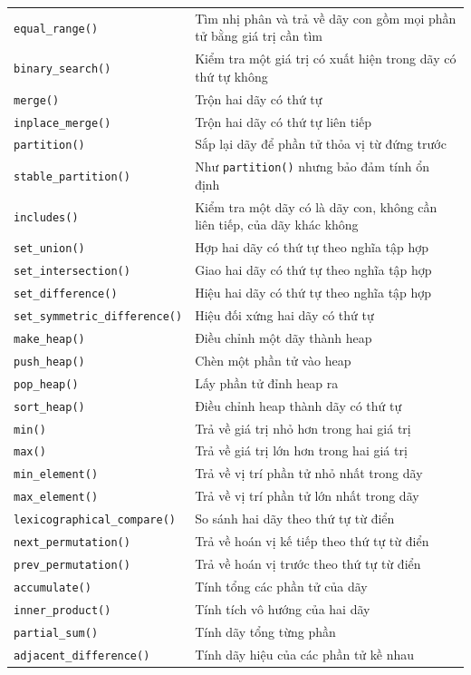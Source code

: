 \documentclass[11pt]{article}
\begin{document}
\begin{longtable}{p{}p{}}
\verb|equal_range()| & Tìm nhị phân và trả về dãy con gồm mọi phần tử bằng giá trị cần tìm\\
\verb|binary_search()| & Kiểm tra một giá trị có xuất hiện trong dãy có thứ tự không\\
\verb|merge()| & Trộn hai dãy có thứ tự\\
\verb|inplace_merge()| & Trộn hai dãy có thứ tự liên tiếp\\
\verb|partition()| & Sắp lại dãy để phần tử thỏa vị từ đứng trước\\
\verb|stable_partition()| & Như \verb|partition()| nhưng bảo đảm tính ổn định\\
\verb|includes()| & Kiểm tra một dãy có là dãy con, không cần liên tiếp, của dãy khác không\\
\verb|set_union()| & Hợp hai dãy có thứ tự theo nghĩa tập hợp\\
\verb|set_intersection()| & Giao hai dãy có thứ tự theo nghĩa tập hợp\\
\verb|set_difference()| & Hiệu hai dãy có thứ tự theo nghĩa tập hợp\\
\verb|set_symmetric_difference()| & Hiệu đối xứng hai dãy có thứ tự\\
\verb|make_heap()| & Điều chỉnh một dãy thành heap\\
\verb|push_heap()| & Chèn một phần tử vào heap\\
\verb|pop_heap()| & Lấy phần tử đỉnh heap ra\\
\verb|sort_heap()| & Điều chỉnh heap thành dãy có thứ tự\\
\verb|min()| & Trả về giá trị nhỏ hơn trong hai giá trị\\
\verb|max()| & Trả về giá trị lớn hơn trong hai giá trị\\
\verb|min_element()| & Trả về vị trí phần tử nhỏ nhất trong dãy\\
\verb|max_element()| & Trả về vị trí phần tử lớn nhất trong dãy\\
\verb|lexicographical_compare()| & So sánh hai dãy theo thứ tự từ điển\\
\verb|next_permutation()| & Trả về hoán vị kế tiếp theo thứ tự từ điển\\
\verb|prev_permutation()| & Trả về hoán vị trước theo thứ tự từ điển\\
\verb|accumulate()| & Tính tổng các phần tử của dãy\\
\verb|inner_product()| & Tính tích vô hướng của hai dãy\\
\verb|partial_sum()| & Tính dãy tổng từng phần\\
\verb|adjacent_difference()| & Tính dãy hiệu của các phần tử kề nhau\\
\hline
\end{longtable}
\end{document}
